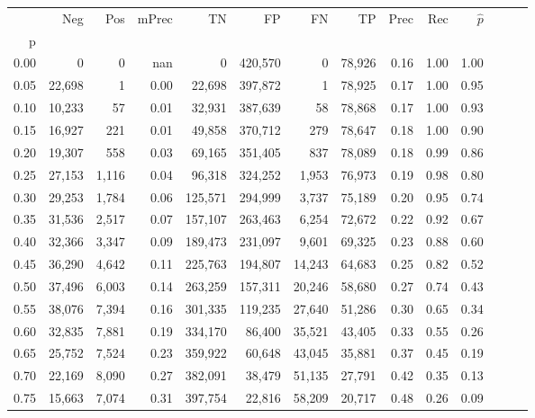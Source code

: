 \begin{tabular}{rrrrrrrrrrrrrr}
\toprule
{} &     Neg &    Pos & mPrec &       TN &       FP &      FN &      TP &  Prec &   Rec & $\hat{p}$ \\
p    &         &        &       &          &          &         &         &       &       &           \\
\midrule
0.00 &       0 &      0 &   nan &        0 &  420,570 &       0 &  78,926 &  0.16 &  1.00 &      1.00 \\
0.05 &  22,698 &      1 &  0.00 &   22,698 &  397,872 &       1 &  78,925 &  0.17 &  1.00 &      0.95 \\
0.10 &  10,233 &     57 &  0.01 &   32,931 &  387,639 &      58 &  78,868 &  0.17 &  1.00 &      0.93 \\
0.15 &  16,927 &    221 &  0.01 &   49,858 &  370,712 &     279 &  78,647 &  0.18 &  1.00 &      0.90 \\
0.20 &  19,307 &    558 &  0.03 &   69,165 &  351,405 &     837 &  78,089 &  0.18 &  0.99 &      0.86 \\
0.25 &  27,153 &  1,116 &  0.04 &   96,318 &  324,252 &   1,953 &  76,973 &  0.19 &  0.98 &      0.80 \\
0.30 &  29,253 &  1,784 &  0.06 &  125,571 &  294,999 &   3,737 &  75,189 &  0.20 &  0.95 &      0.74 \\
0.35 &  31,536 &  2,517 &  0.07 &  157,107 &  263,463 &   6,254 &  72,672 &  0.22 &  0.92 &      0.67 \\
0.40 &  32,366 &  3,347 &  0.09 &  189,473 &  231,097 &   9,601 &  69,325 &  0.23 &  0.88 &      0.60 \\
0.45 &  36,290 &  4,642 &  0.11 &  225,763 &  194,807 &  14,243 &  64,683 &  0.25 &  0.82 &      0.52 \\
0.50 &  37,496 &  6,003 &  0.14 &  263,259 &  157,311 &  20,246 &  58,680 &  0.27 &  0.74 &      0.43 \\
0.55 &  38,076 &  7,394 &  0.16 &  301,335 &  119,235 &  27,640 &  51,286 &  0.30 &  0.65 &      0.34 \\
0.60 &  32,835 &  7,881 &  0.19 &  334,170 &   86,400 &  35,521 &  43,405 &  0.33 &  0.55 &      0.26 \\
0.65 &  25,752 &  7,524 &  0.23 &  359,922 &   60,648 &  43,045 &  35,881 &  0.37 &  0.45 &      0.19 \\
0.70 &  22,169 &  8,090 &  0.27 &  382,091 &   38,479 &  51,135 &  27,791 &  0.42 &  0.35 &      0.13 \\
0.75 &  15,663 &  7,074 &  0.31 &  397,754 &   22,816 &  58,209 &  20,717 &  0.48 &  0.26 &      0.09 \\

\end{tabular}
